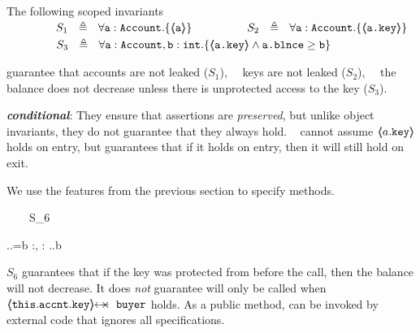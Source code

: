 \begin{example}
\label{s:bankSpecEx}
The following scoped invariants\\
$\strut \SPSP\ \ \   S_1\ \  \triangleq \ \ \TwoStatesN {\prg{a}:\prg{Account}}  {\inside{\prg{a}}} $ 
\hspace{1.1cm}
$\strut  \SPSP\ \ \   S_2\ \  \triangleq \ \ \TwoStatesN  {\prg{a}:\prg{Account}}  {\inside{\prg{a.key}}} $ 
\\
$\strut  \SPSP\ \ \   S_3\ \  \triangleq \ \ \TwoStatesN{ \prg{a}:\prg{Account},\prg{b}:\prg{int} } {\inside{\prg{a.key}} \wedge \prg{a.\balance} \geq \prg{b} } $ 

\noindent
 guarantee that   accounts are not leaked  ($S_1$), \ \ keys are not leaked  ($S_2$), \ \ the balance does not decrease unless there is unprotected access to the key  ($S_3$).
%
\end{example} 


 
 \vspace{.05cm}

 
\noindent
{\textbf{ 
 \emph{conditional}}:}  They ensure that assertions are \emph{preserved}, but unlike object invariants, they do not guarantee that they always hold.
\ \Eg   {} cannot assume $\langle\!\!\langle a.\mbox{\normalfont{\texttt{key}}} \rangle\!\!\rangle$ holds on entry, but   guarantees that if it holds on entry, then  it will still hold on exit.

 
 \begin{example}
 We   use the features from the previous section to specify methods. 

{\sprepost
		{\strut \ \ \ \ S_6} 
		{    {} \wedge {}.\prg{\myAccount}.\prg{\balance}=b
		 }
		{} {} {:, : }
		{ 
		  .\prg{\myAccount}.\prg{\balance}\geq b
		 }
}

\noindent
$S_6$  guarantees that if the %
key was protected from  before the call, then the balance will not decrease. %
 It does \emph{not} guarantee  will only be called when $\protectedFrom{\prg{this}.\prg{\myAccount}.\prg{key}} {\prg{buyer}}$ holds. 
As a  public method,    can be invoked by external code that ignores all specifications.
\end{example}

